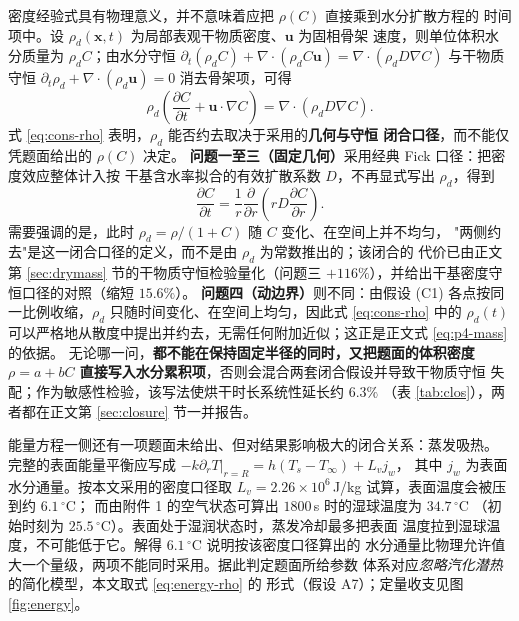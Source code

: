 \documentclass[12pt,a4paper,fontset=none]{ctexart}
\begin{document}
密度经验式具有物理意义，并不意味着应把 $\rho(C)$ 直接乘到水分扩散方程的
时间项中。设 $\rho_d(\bm x,t)$ 为局部表观干物质密度、$\bm u$ 为固相骨架
速度，则单位体积水分质量为 $\rho_dC$；由水分守恒
$\partial_t(\rho_dC)+\nabla\!\cdot(\rho_dC\bm u)
=\nabla\!\cdot(\rho_dD\nabla C)$ 与干物质守恒
$\partial_t\rho_d+\nabla\!\cdot(\rho_d\bm u)=0$ 消去骨架项，可得
\begin{equation}
  \rho_d
  \left(
    \frac{\partial C}{\partial t}
    +\bm u\!\cdot\nabla C
  \right)
  =\nabla\!\cdot(\rho_dD\nabla C).
  \label{eq:cons-rho}
\end{equation}
式 \eqref{eq:cons-rho} 表明，$\rho_d$ 能否约去取决于采用的\textbf{几何与守恒
闭合口径}，而不能仅凭题面给出的 $\rho(C)$ 决定。
\textbf{问题一至三（固定几何）}采用经典 Fick 口径：把密度效应整体计入按
干基含水率拟合的有效扩散系数 $D$，不再显式写出 $\rho_d$，得到
\begin{equation}
  \frac{\partial C}{\partial t}
  =\frac{1}{r}\frac{\partial}{\partial r}
  \left(rD\frac{\partial C}{\partial r}\right).
  \label{eq:rho-eliminated}
\end{equation}
需要强调的是，此时 $\rho_d=\rho/(1+C)$ 随 $C$ 变化、在空间上并不均匀，
"两侧约去"是这一闭合口径的定义，而不是由 $\rho_d$ 为常数推出的；该闭合的
代价已由正文第 \ref{sec:drymass} 节的干物质守恒检验量化（问题三
$+116\%$），并给出干基密度守恒口径的对照（缩短 $15.6\%$）。
\textbf{问题四（动边界）}则不同：由假设 (C1) 各点按同一比例收缩，$\rho_d$
只随时间变化、在空间上均匀，因此式 \eqref{eq:cons-rho} 中的 $\rho_d(t)$
可以严格地从散度中提出并约去，无需任何附加近似；这正是正文式
\eqref{eq:p4-mass} 的依据。
无论哪一问，\textbf{都不能在保持固定半径的同时，又把题面的体积密度
$\rho=a+bC$ 直接写入水分累积项}，否则会混合两套闭合假设并导致干物质守恒
失配；作为敏感性检验，该写法使烘干时长系统性延长约 $6.3\%$
（表 \ref{tab:clos}），两者都在正文第 \ref{sec:closure} 节一并报告。

能量方程一侧还有一项题面未给出、但对结果影响极大的闭合关系：蒸发吸热。
完整的表面能量平衡应写成
$-k\left.\partial_rT\right|_{r=R}=h(T_s-T_\infty)+L_vj_w$，
其中 $j_w$ 为表面水分通量。按本文采用的密度口径取
$L_v=2.26\times10^6$\,J/kg 试算，表面温度会被压到约 $6.1\,^\circ$C；
而由附件 1 的空气状态可算出 $1800$\,s 时的湿球温度为 $34.7\,^\circ$C
（初始时刻为 $25.5\,^\circ$C）。表面处于湿润状态时，蒸发冷却最多把表面
温度拉到湿球温度，不可能低于它。解得 $6.1\,^\circ$C 说明按该密度口径算出的
水分通量比物理允许值大一个量级，两项不能同时采用。据此判定题面所给参数
体系对应\emph{忽略汽化潜热}的简化模型，本文取式 \eqref{eq:energy-rho} 的
形式（假设 A7）；定量收支见图 \ref{fig:energy}。
\end{document}
